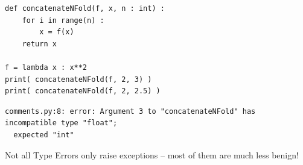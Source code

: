 \begin{frame}[fragile]
\begin{codebox}
\begin{verbatim}
def concatenateNFold(f, x, n : int) :
    for i in range(n) :
        x = f(x)
    return x

f = lambda x : x**2
print( concatenateNFold(f, 2, 3) )
print( concatenateNFold(f, 2, 2.5) )
\end{verbatim}
\end{codebox}
%
\begin{cmdbox}
\begin{verbatim}
comments.py:8: error: Argument 3 to "concatenateNFold" has incompatible type "float";
  expected "int"
\end{verbatim}
\end{cmdbox}
%
\begin{hintbox}
\small
Not all Type Errors only raise exceptions -- most of them are much less benign!
\end{hintbox}
%
\end{frame}



